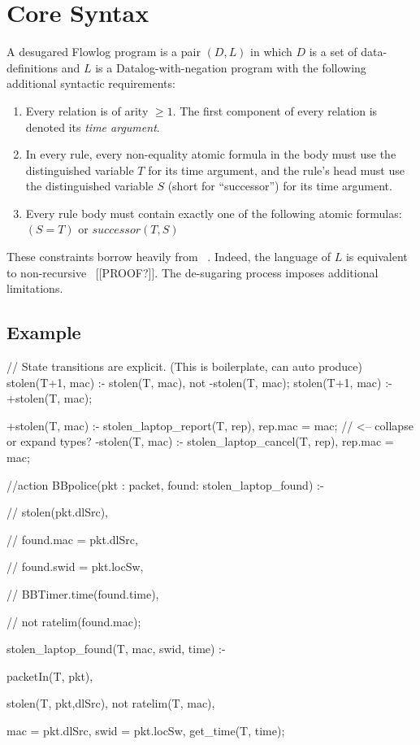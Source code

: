 \section{Core Syntax}

A desugared Flowlog program is a pair $(D, L)$ in which $D$ is a set
of data-definitions and $L$ is a Datalog-with-negation program with
the following additional syntactic requirements:

\begin{enumerate}

\item{Every relation is of arity $\geq 1$. The first component of
  every relation is denoted its \emph{time argument}. }

\item{In every rule, every non-equality atomic formula in the body
  must use the distinguished variable $T$ for its time argument, and
  the rule's head must use the distinguished variable $S$ (short for
  ``successor'') for its time argument.}

\item{Every rule body must contain exactly one of the following atomic
  formulas: $(S = T)$ or $successor(T, S)$}

\end{enumerate}

\noindent These constraints borrow heavily from
\dedalus~\cite{}. Indeed, the language of $L$ is equivalent to
non-recursive \dedalus\ [[PROOF?]]. The de-sugaring process imposes
additional limitations.

\subsection{Example}

\begin{flowlog}
// State transitions are explicit. (This is boilerplate, can auto produce)
  stolen(T+1, mac) :- stolen(T, mac), not -stolen(T, mac);
  stolen(T+1, mac) :- +stolen(T, mac);

  +stolen(T, mac) :- stolen_laptop_report(T, rep), rep.mac = mac; // <-- collapse or expand types?
  -stolen(T, mac) :- stolen_laptop_cancel(T, rep), rep.mac = mac; 

//action BBpolice(pkt : packet, found: stolen_laptop_found) :- 

//  stolen(pkt.dlSrc),

//  found.mac = pkt.dlSrc,

//  found.swid = pkt.locSw,

//  BBTimer.time(found.time),

//  not ratelim(found.mac);



stolen_laptop_found(T, mac, swid, time) :-

  packetIn(T, pkt),

  stolen(T, pkt,dlSrc), not ratelim(T, mac),

  mac = pkt.dlSrc, swid = pkt.locSw, get_time(T, time);
\end{flowlog}


